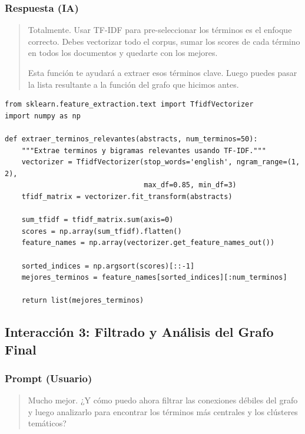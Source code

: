 \documentclass[12pt]{article}
\begin{document}
\subsubsection*{Respuesta (IA)}
\begin{quote}
Totalmente. Usar TF-IDF para pre-seleccionar los términos es el enfoque correcto. Debes vectorizar todo el corpus, sumar los scores de cada término en todos los documentos y quedarte con los mejores.

Esta función te ayudará a extraer esos términos clave. Luego puedes pasar la lista resultante a la función del grafo que hicimos antes.
\end{quote}
\begin{lstlisting}
from sklearn.feature_extraction.text import TfidfVectorizer
import numpy as np

def extraer_terminos_relevantes(abstracts, num_terminos=50):
    """Extrae terminos y bigramas relevantes usando TF-IDF."""
    vectorizer = TfidfVectorizer(stop_words='english', ngram_range=(1, 2), 
                                 max_df=0.85, min_df=3)
    tfidf_matrix = vectorizer.fit_transform(abstracts)
    
    sum_tfidf = tfidf_matrix.sum(axis=0)
    scores = np.array(sum_tfidf).flatten()
    feature_names = np.array(vectorizer.get_feature_names_out())
    
    sorted_indices = np.argsort(scores)[::-1]
    mejores_terminos = feature_names[sorted_indices][:num_terminos]
    
    return list(mejores_terminos)
\end{lstlisting}

\subsection{Interacción 3: Filtrado y Análisis del Grafo Final}

\subsubsection*{Prompt (Usuario)}
\begin{quote}
Mucho mejor. ¿Y cómo puedo ahora filtrar las conexiones débiles del grafo y luego analizarlo para encontrar los términos más centrales y los clústeres temáticos?
\end{quote}
\end{document}
